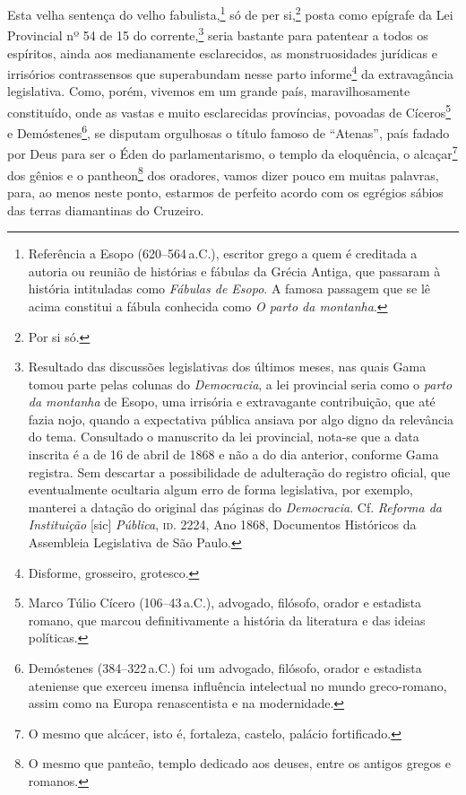 Esta velha sentença do velho fabulista,\footnote{Referência a Esopo
  (620--564\,a.C.), escritor grego a quem é creditada a autoria ou reunião
  de histórias e fábulas da Grécia Antiga, que passaram à história
  intituladas como \emph{Fábulas de Esopo}. A famosa passagem que se lê
  acima constitui a fábula conhecida como \emph{O parto da montanha}.}
só de per si,\footnote{Por si só.} posta como epígrafe da Lei
Provincial nº 54 de 15 do corrente,\footnote{Resultado das discussões
  legislativas dos últimos meses, nas quais Gama tomou parte pelas
  colunas do \emph{Democracia}, a lei provincial seria como o
  \emph{parto da montanha} de Esopo, uma irrisória e extravagante
  contribuição, que até fazia nojo, quando a expectativa pública ansiava
  por algo digno da relevância do tema. Consultado o manuscrito da lei
  provincial, nota-se que a data inscrita é a de 16 de abril de 1868 e não a do
  dia anterior, conforme Gama registra. Sem descartar a possibilidade de
  adulteração do registro oficial, que eventualmente ocultaria algum
  erro de forma legislativa, por exemplo, manterei a datação do original
  das páginas do \emph{Democracia}. Cf. \emph{Reforma da Instituição}
  {[}sic{]} \emph{Pública}, \textsc{id}. 2224, Ano 1868, Documentos Históricos da
  Assembleia Legislativa de São Paulo.} seria bastante para patentear a
todos os espíritos, ainda aos medianamente esclarecidos, as
monstruosidades jurídicas e irrisórios contrassensos que superabundam
nesse parto informe\footnote{Disforme, grosseiro, grotesco.} da
extravagância legislativa. Como, porém, vivemos em um grande país,
maravilhosamente constituído, onde as vastas e muito esclarecidas
províncias, povoadas de Cíceros\footnote{Marco Túlio Cícero (106--43\,a.C.), 
advogado, filósofo, orador e estadista romano, que
  marcou definitivamente a história da literatura e das ideias
  políticas.} e Demóstenes\footnote{Demóstenes (384--322\,a.C.) foi
  um advogado, filósofo, orador e estadista ateniense que exerceu imensa
  influência intelectual no mundo greco-romano, assim como na Europa
  renascentista e na modernidade.}, se disputam orgulhosas o título
famoso de ``Atenas'', país fadado por Deus para ser o Éden do
parlamentarismo, o templo da eloquência, o alcaçar\footnote{O mesmo
  que alcácer, isto é, fortaleza, castelo, palácio fortificado.} dos
gênios e o pantheon\footnote{O mesmo que panteão, templo dedicado aos
  deuses, entre os antigos gregos e romanos.} dos oradores, vamos dizer
pouco em muitas palavras, para, ao menos neste ponto, estarmos de
perfeito acordo com os egrégios sábios das terras diamantinas do
Cruzeiro.

